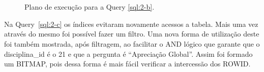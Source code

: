 \documentclass[a4paper,12pt]{article}
\begin{document}
\begin{figure}[hpt]
   \begin{center}
      \\
      \\
   \end{center}
   \caption{Plano de execução para a Query \ref{sql:2-b}.}
   \label{fig:plano_2-b}
\end{figure}

Na Query~\ref{sql:2-c} os índices evitaram novamente acessos a tabela. Mais uma vez
através do mesmo foi possível fazer um filtro. Uma nova forma de utilização deste
foi também mostrada, após filtragem, ao facilitar o AND lógico que garante
que o disciplina\_id é o 21 e que a pergunta é ``Apreciação Global''. Assim foi formado
um BITMAP, pois dessa forma é mais fácil verificar a intercessão dos ROWID.
\end{document}
